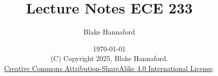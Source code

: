 \documentclass[letterpaper,12pt]{book}
\begin{document}
\title{Lecture Notes ECE 233 }

\author{Blake Hannaford}

\maketitle

\date{\today\\(C) Copyright 2025, Blake Hannaford.\\
\href{http://creativecommons.org/licenses/by-sa/4.0/}{Creative Commons Attribution-ShareAlike 4.0 International License}.}
%
\tableofcontents
%
%
%
\mainmatter
%

\newpage


%




%
% 
%
% 
% 


\end{document}
